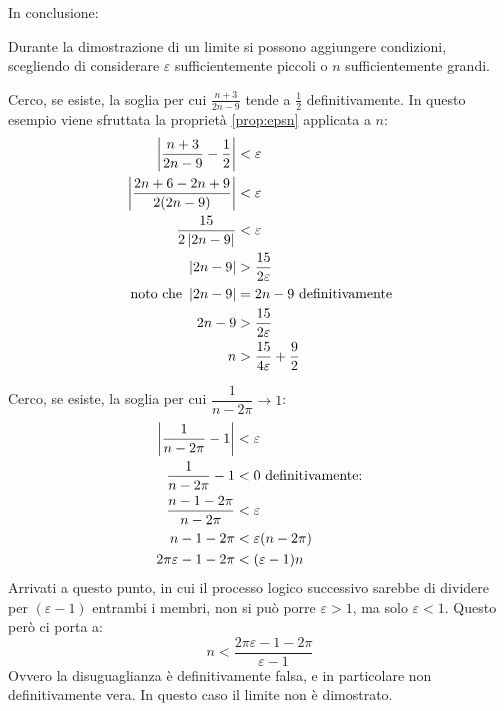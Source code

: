In conclusione:
\begin{prop}
	\label{prop:epsn}
	Durante la dimostrazione di un limite si possono aggiungere condizioni, scegliendo di considerare $\varepsilon$ sufficientemente piccoli o $n$ sufficientemente grandi.
\end{prop}

\begin{examp}
	Cerco, se esiste, la soglia per cui $\frac{n+3}{2n-9}$ tende a $\frac{1}{2}$ definitivamente. In questo esempio viene sfruttata la proprietà \ref{prop:epsn} applicata a $n$:
	\begin{align*}
		\left\lvert \frac{n+3}{2n-9}-\frac{1}{2} \right\rvert & <\varepsilon                         \\
		\left\lvert \frac{2n+6-2n+9}{2(2n-9)} \right\rvert    & <\varepsilon                         \\
		\frac{15}{2\left\lvert 2n-9 \right\rvert}             & <\varepsilon                         \\
		\left\lvert 2n-9 \right\rvert                         & >\frac{15}{2\varepsilon}             \\
		\text{noto che } \left\lvert 2n-9 \right\rvert        & = 2n-9 \text{ definitivamente}       \\
		2n-9                               & >\frac{15}{2\varepsilon}             \\
		n                                  & >\frac{15}{4\varepsilon}+\frac{9}{2}
	\end{align*}
\end{examp}
\begin{examp}
	Cerco, se esiste, la soglia per cui $\dfrac{1}{n-2\pi}\to 1$:
	\begin{align*}
		\left\lvert \frac{1}{n-2\pi}-1 \right\rvert & <\varepsilon                \\
		\frac{1}{n-2\pi}-1       & < 0\text{ definitivamente:} \\
		\frac{n-1-2\pi}{n-2\pi}  & <\varepsilon                \\
		n-1-2\pi                 & <\varepsilon(n-2\pi)        \\
		2\pi\varepsilon-1-2\pi   & <(\varepsilon-1)n
	\end{align*}
	Arrivati a questo punto, in cui il processo logico successivo sarebbe di dividere per $(\varepsilon-1)$ entrambi i membri, non si può porre $\varepsilon>1$, ma solo $\varepsilon<1$. Questo però ci porta a:
	\[
		n <\frac{2\pi\varepsilon-1-2\pi}{\varepsilon-1}
	\]
	Ovvero la disuguaglianza è definitivamente falsa, e in particolare non definitivamente vera. In questo caso il limite non è dimostrato.
\end{examp}



